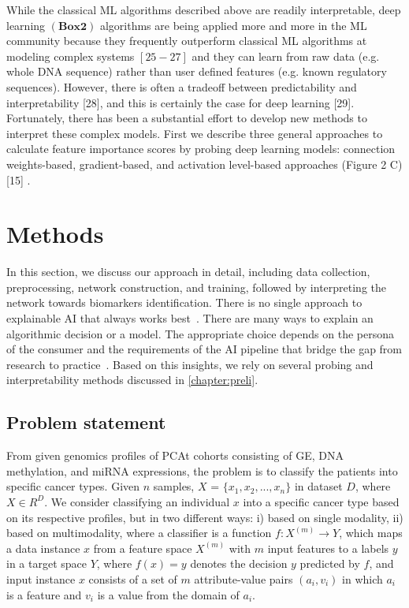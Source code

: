 While the classical ML algorithms described above are readily interpretable, deep
learning $(\mathbf{B} \mathbf{o x} \mathbf{2})$ algorithms are being applied more and more in the ML community because
they frequently outperform classical ML algorithms at modeling complex systems $[25-27]$ and
they can learn from raw data (e.g. whole DNA sequence) rather than user defined features (e.g.
known regulatory sequences). However, there is often a tradeoff between predictability and
interpretability [28], and this is certainly the case for deep learning [29]. Fortunately, there has
been a substantial effort to develop new methods to interpret these complex models. First we
describe three general approaches to calculate feature importance scores by probing deep
learning models: connection weights-based, gradient-based, and activation level-based
approaches (Figure 2 C) [15] .

\section{Methods}\label{chapter_5:mm}
In this section, we discuss our approach in detail, including data collection, preprocessing, network construction, and training, followed by interpreting the network towards biomarkers identification. There is no single approach to explainable AI that always works best~\cite{arya2019one}. There are many ways to explain an algorithmic decision or a model. The appropriate choice depends on the persona of the consumer and the requirements of the AI pipeline that bridge the gap from research to practice~\cite{arya2019one}. Based on this insights, we rely on several probing and interpretability methods discussed in \cref{chapter:preli}. 

\subsection{Problem statement}
From given genomics profiles of PCAt cohorts consisting of GE, DNA methylation, and miRNA expressions, the problem is to classify the patients into specific cancer types. Given $n$ samples, $X$ = ${{\{x_1,x_2, ..., x_n}}\}$ in dataset $D$, where $X \in {R}^{D}$. We consider classifying an individual $x$ into a specific cancer type based on its respective profiles, but in two different ways: i) based on single modality, ii) based on multimodality, where a  classifier is a function $f: {X}^{(m)} \rightarrow {Y}$, which maps a data instance $x$ from a feature space ${X}^{(m)}$ with $m$ input features to a labels $y$ in a target space ${Y}$, where $f(x)=y$ denotes the decision $y$ predicted by $f$, and input instance $x$ consists of a set of $m$ attribute-value pairs $\left(a_{i}, v_{i}\right)$ in which $a_i$ is a feature and $v_i$ is a value from the domain of $a_i$. 

